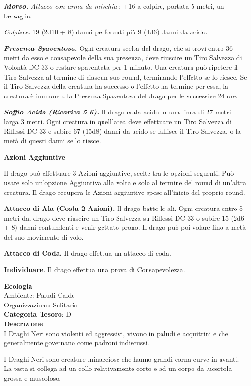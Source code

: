 \begin{multicols}{2}
{\emph{\textbf{Morso.} Attacco con arma da mischia} : +16 a colpire, portata 5 metri, un bersaglio.

\emph{Colpisce:} 19 (2d10 + 8) danni perforanti più 9 (4d6) danni da acido.

\emph{\textbf{Presenza Spaventosa.}} Ogni creatura scelta dal drago, che si trovi entro 36 metri da esso e consapevole della sua presenza, deve riuscire un Tiro Salvezza di Volontà DC 33 o restare spaventata per 1 minuto. Una creatura può ripetere il Tiro Salvezza al termine di ciascun suo round, terminando l'effetto se lo riesce. Se il Tiro Salvezza della creatura ha successo o l'effetto ha termine per essa, la creatura è immune alla Presenza Spaventosa del drago per le successive 24 ore.

\emph{\textbf{Soffio Acido (Ricarica 5-6).}} Il drago esala acido in una linea di 27 metri larga 3 metri. Ogni creatura in quell'area deve effettuare un Tiro Salvezza di Riflessi DC 33 e subire 67 (15d8) danni da acido se fallisce il Tiro Salvezza, o la metà di questi danni se lo riesce.

\textbf{Azioni Aggiuntive}

Il drago può effettuare 3 Azioni aggiuntive, scelte tra le opzioni seguenti. Può usare solo un'opzione Aggiuntiva alla volta e solo al termine del round di un'altra creatura. Il drago recupera le Azioni aggiuntive spese all'inizio del proprio round.

\textbf{Attacco di Ala (Costa 2 Azioni).} Il drago batte le ali. Ogni creatura entro 5 metri dal drago deve riuscire un Tiro Salvezza su Riflessi DC 33 o subire 15 (2d6 + 8) danni contundenti e venir gettato prono. Il drago può poi volare fino a metà del suo movimento di volo.

\textbf{Attacco di Coda.} Il drago effettua un attacco di coda.

\textbf{Individuare.} Il drago effettua una prova di Consapevolezza.

\textbf{Ecologia}\\
Ambiente: Paludi Calde\\
Organizzazione: Solitario\\
\textbf{Categoria Tesoro}: D\\
\textbf{Descrizione}\\
I Draghi Neri sono violenti ed aggressivi, vivono in paludi e acquitrini e che generalmente governano come padroni indiscussi.

I Draghi Neri sono creature minacciose che hanno grandi corna curve in avanti.
La testa si collega ad un collo relativamente corto e ad un corpo da lucertola grossa e muscoloso.

}
\end{multicols}
